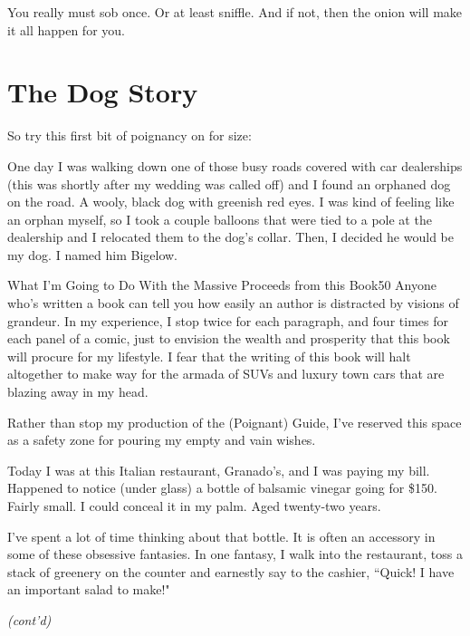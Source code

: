 \documentclass[12pt,twoside]{report}
\begin{document}
You really must sob once.  Or at least sniffle.  And if not, then the
onion will make it all happen for you.


\section{The Dog Story}


So try this first bit of poignancy on for size:

One day I was walking down one of those busy roads covered with car
dealerships (this was shortly after my wedding was called off) and I
found an orphaned dog on the road.  A wooly, black dog with greenish
red eyes.  I was kind of feeling like an orphan myself, so I took a
couple balloons that were tied to a pole at the dealership and I
relocated them to the dog's collar.  Then, I decided he would be my
dog.  I named him Bigelow.

	\begin{sidebar}{What I'm Going to Do With the Massive Proceeds from this Book}{50}
	Anyone who's written a book can tell you how easily an author is distracted by visions of grandeur. In my experience, I stop twice for each paragraph, and four times for each panel of a comic, just to envision the wealth and prosperity that this book will procure for my lifestyle. I fear that the writing of this book will halt altogether to make way for the armada of SUVs and luxury town cars that are blazing away in my head.\vspace{6pt}

	Rather than stop my production of the (Poignant) Guide, I've reserved this space as a safety zone for pouring my empty and vain wishes.\vspace{6pt}

	Today I was at this Italian restaurant, Granado's, and I was paying my bill. Happened to notice (under glass) a bottle of balsamic vinegar going for \$150. Fairly small. I could conceal it in my palm. Aged twenty-two years.\vspace{6pt}

	I've spent a lot of time thinking about that bottle. It is often an accessory in some of these obsessive fantasies. In one fantasy, I walk into the restaurant, toss a stack of greenery on the counter and earnestly say to the cashier, ``Quick! I have an important salad to make!" \vspace{6pt}
	
	\textit{(cont'd)} \vspace{6pt}
	\end{sidebar}
\end{document}
